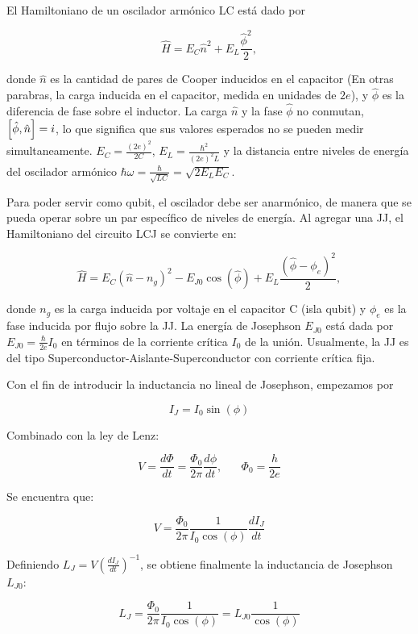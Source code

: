 El Hamiltoniano de un oscilador armónico LC está dado por 

\begin{equation}
\hat{H} = E_C \hat{n}^2 + E_L \frac{\hat{\phi}^2}{2},
\end{equation}

donde $\hat{n}$ es la cantidad de pares de Cooper inducidos en el capacitor (En otras parabras, la carga inducida en el capacitor, medida en unidades de $2e$), y $\hat{\phi}$ es la diferencia de fase sobre el inductor. La carga $\hat{n}$ y la fase $\hat{\phi}$ no conmutan, $\comm{\hat{\phi}}{\hat{n}}=i$, lo que significa que sus valores esperados no se pueden medir simultaneamente. $E_C=\frac{(2e)^2}{2C}$, $E_L=\frac{\hbar^2}{(2e)^2L}$ y la distancia entre niveles de energía del oscilador armónico $\hbar \omega = \frac{\hbar}{\sqrt{LC}}=\sqrt{2E_LE_C}$.
\vspace{0.5cm}

Para poder servir como qubit, el oscilador debe ser anarmónico, de manera que se pueda operar sobre un par específico de niveles de energía. Al agregar una JJ, el Hamiltoniano del circuito LCJ se convierte en:

\[
\hat{H} = E_C (\hat{n}-n_g)^2 - E_{J0} \cos( \hat{\phi} ) + E_L \frac{(\hat{\phi}-\phi_e)^2}{2},
\]

donde $n_g$ es la carga inducida por voltaje en el capacitor C (isla qubit) y $\phi_e$ es la fase inducida por flujo sobre la JJ. La energía de Josephson $E_{J0}$ está dada por $E_{J0}=\frac{\hbar}{2e}I_0$ en términos de la corriente crítica $I_0$ de la unión. Usualmente, la JJ es del tipo Superconductor-Aislante-Superconductor con corriente crítica fija.

Con el fin de introducir la inductancia no lineal de Josephson, empezamos por 

\[
I_J = I_0 \sin(\phi)
\]

Combinado con la ley de Lenz:

\[
V = \frac{d\Phi}{dt} = \frac{\Phi_0}{2\pi} \frac{d\phi}{dt}, \hspace{20pt} \Phi_0=\frac{h}{2e}
\]

Se encuentra que:

\[
V = \frac{\Phi_0}{2\pi} \frac{1}{I_0\cos(\phi)} \frac{dI_J}{dt}
\]

Definiendo $L_J = V (\frac{dI_J}{dt})^{-1}$, se obtiene finalmente la inductancia de Josephson $L_{J0}$:

\[
L_J = \frac{\Phi_0}{2\pi} \frac{1}{I_0 \cos(\phi)} = L_{J0} \frac{1}{\cos(\phi)}
\]

